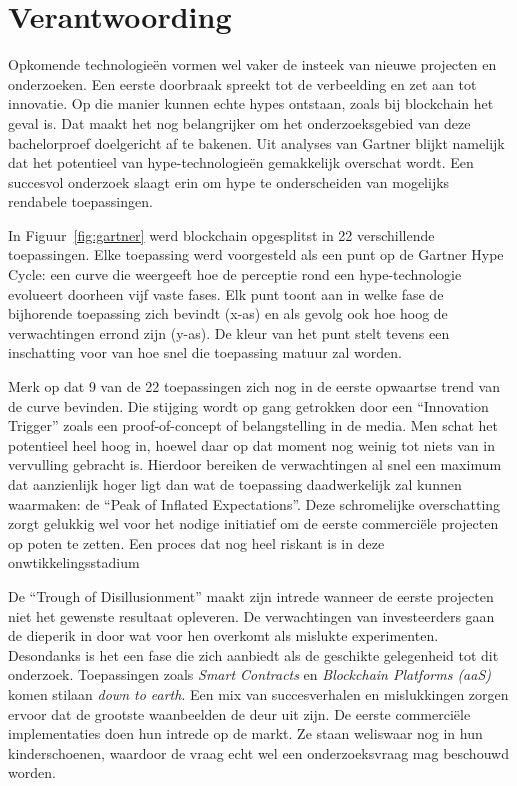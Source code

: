 \section{Verantwoording}
\label{sec:verantwoording}

Opkomende technologieën vormen wel vaker de insteek van nieuwe projecten en onderzoeken. Een eerste doorbraak spreekt tot de verbeelding en zet aan tot innovatie. Op die manier kunnen echte hypes ontstaan, zoals bij blockchain het geval is. Dat maakt het nog belangrijker om het onderzoeksgebied van deze bachelorproef doelgericht af te bakenen. Uit analyses van Gartner blijkt namelijk dat het potentieel van hype-technologieën gemakkelijk overschat wordt. Een succesvol onderzoek slaagt erin om hype te onderscheiden van mogelijks rendabele toepassingen.

In Figuur~\ref{fig:gartner} werd blockchain opgesplitst in 22 verschillende toepassingen. Elke toepassing werd voorgesteld als een punt op de Gartner Hype Cycle: een curve die weergeeft hoe de perceptie rond een hype-technologie evolueert doorheen vijf vaste fases. Elk punt toont aan in welke fase de bijhorende toepassing zich bevindt (x-as) en als gevolg ook hoe hoog de verwachtingen errond zijn (y-as). De kleur van het punt stelt tevens een inschatting voor van hoe snel die toepassing matuur zal worden. 

Merk op dat 9 van de 22 toepassingen zich nog in de eerste opwaartse trend van de curve bevinden.
Die stijging wordt op gang getrokken door  een ``Innovation Trigger'' zoals een proof-of-concept of belangstelling in de media. Men schat het potentieel heel hoog in, hoewel daar op dat moment nog weinig tot niets van in vervulling gebracht is. Hierdoor bereiken de verwachtingen al snel een maximum dat aanzienlijk hoger ligt dan wat de toepassing daadwerkelijk zal kunnen waarmaken: de ``Peak of Inflated Expectations''. Deze schromelijke overschatting zorgt gelukkig wel voor het nodige initiatief om de eerste commerciële projecten op poten te zetten. Een proces dat nog heel riskant is in deze onwtikkelingsstadium

De ``Trough of Disillusionment'' maakt zijn intrede wanneer de eerste projecten niet het gewenste resultaat opleveren.
De verwachtingen van investeerders gaan de dieperik in door wat voor hen overkomt als mislukte experimenten. Desondanks is het een fase die zich aanbiedt als de geschikte gelegenheid tot dit onderzoek. Toepassingen zoals \textit{Smart Contracts} en \textit{Blockchain Platforms (aaS)} komen stilaan \textit{down to earth}. Een mix van succesverhalen en mislukkingen zorgen ervoor dat de grootste waanbeelden de deur uit zijn. De eerste commerciële implementaties doen hun intrede op de markt. Ze staan weliswaar nog in hun kinderschoenen, waardoor de vraag echt wel een onderzoeksvraag mag beschouwd worden. 

